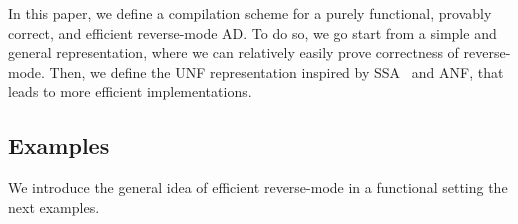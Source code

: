 



In this paper, we define a compilation scheme for a purely functional, provably correct, and efficient reverse-mode AD. 
To do so, we go start from a simple and general representation, where we can relatively easily prove correctness of reverse-mode.
Then, we define the UNF representation inspired by SSA~\cite{cytron1989efficient} and ANF, that leads to more efficient implementations.



\subsection{Examples}

We introduce the general idea of efficient reverse-mode in a functional setting the next examples.

